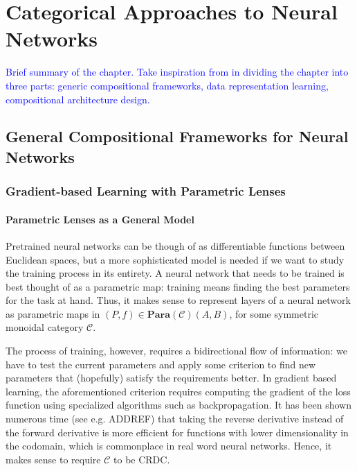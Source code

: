 \documentclass[11pt,a4paper,openright,twoside]{report}
\theoremstyle{plain}
\theoremstyle{definition}
\begin{document}
\chapter{Categorical Approaches to Neural Networks}
\lhead[\fancyplain{}{\bfseries\thepage}]{\fancyplain{}{\bfseries\rightmark}}




\textcolor{blue}{Brief summary of the chapter. Take inspiration from \cite{abbottCategoryTheoryArtificial2024} in dividing the chapter into three parts: generic compositional frameworks, data representation learning, compositional architecture design.}




\section{General Compositional Frameworks for Neural Networks}



\subsection{Gradient-based Learning with Parametric Lenses}

\subsubsection{Parametric Lenses as a General Model}

Pretrained neural networks can be though of as differentiable functions between Euclidean spaces, but a more sophisticated model is needed if we want to study the training process in its entirety. A neural network that needs to be trained is best thought of as a parametric map: training means finding the best parameters for the task at hand. Thus, it makes sense to represent layers of a neural network as parametric maps in $(P,f) \in \mathbf{Para}(\mathcal{C})(A,B)$, for some symmetric monoidal category $\mathcal{C}$.


The process of training, however, requires a bidirectional flow of information: we have to test the current parameters and apply some criterion to find new parameters that (hopefully) satisfy the requirements better. In gradient based learning, the aforementioned criterion requires computing the gradient of the loss function using specialized algorithms such as backpropagation. It has been shown numerous time (see e.g. ADDREF) that taking the reverse derivative instead of the forward derivative is more efficient for functions with lower dimensionality in the codomain, which is commonplace in real word neural networks. Hence, it makes sense to require $\mathcal{C}$ to be CRDC. 
\end{document}
